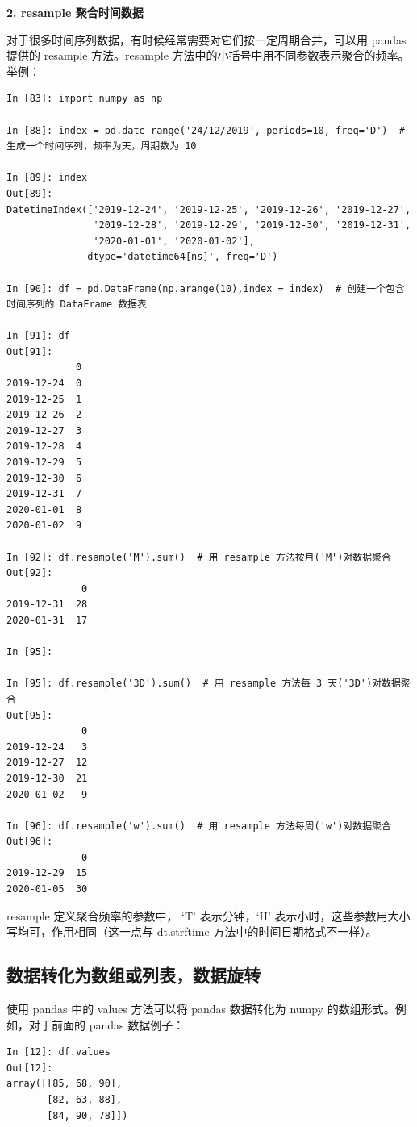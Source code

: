 \vspace{3pt}
\noindent\textbf{2. resample 聚合时间数据}
\vspace{3pt}

对于很多时间序列数据，有时候经常需要对它们按一定周期合并，可以用 pandas 提供的 resample 方法。resample 方法中的小括号中用不同参数表示聚合的频率。举例：

\begin{lstlisting}[Language=Python]
In [83]: import numpy as np

In [88]: index = pd.date_range('24/12/2019', periods=10, freq='D')  # 生成一个时间序列，频率为天，周期数为 10

In [89]: index
Out[89]:
DatetimeIndex(['2019-12-24', '2019-12-25', '2019-12-26', '2019-12-27',
               '2019-12-28', '2019-12-29', '2019-12-30', '2019-12-31',
               '2020-01-01', '2020-01-02'],
              dtype='datetime64[ns]', freq='D')

In [90]: df = pd.DataFrame(np.arange(10),index = index)  # 创建一个包含时间序列的 DataFrame 数据表

In [91]: df
Out[91]:
            0
2019-12-24  0
2019-12-25  1
2019-12-26  2
2019-12-27  3
2019-12-28  4
2019-12-29  5
2019-12-30  6
2019-12-31  7
2020-01-01  8
2020-01-02  9

In [92]: df.resample('M').sum()  # 用 resample 方法按月('M')对数据聚合
Out[92]:
             0
2019-12-31  28
2020-01-31  17

In [95]:

In [95]: df.resample('3D').sum()  # 用 resample 方法每 3 天('3D')对数据聚合
Out[95]:
             0
2019-12-24   3
2019-12-27  12
2019-12-30  21
2020-01-02   9

In [96]: df.resample('w').sum()  # 用 resample 方法每周('w')对数据聚合
Out[96]:
             0
2019-12-29  15
2020-01-05  30
\end{lstlisting}

resample 定义聚合频率的参数中， `T' 表示分钟，`H' 表示小时，这些参数用大小写均可，作用相同（这一点与 dt.strftime 方法中的时间日期格式不一样）。

\subsection{数据转化为数组或列表，数据旋转}

使用 pandas 中的 values 方法可以将 pandas 数据转化为 numpy 的数组形式。例如，对于前面的 pandas 数据例子：

\begin{lstlisting}[Language=Python]
In [12]: df.values
Out[12]:
array([[85, 68, 90],
       [82, 63, 88],
       [84, 90, 78]])
\end{lstlisting}

